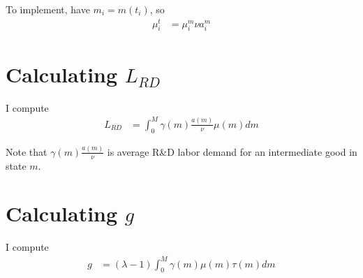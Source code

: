 \documentclass[12pt,english]{article}
\theoremstyle{remark}
\begin{document}
To implement, have $m_i = m(t_i)$, so
\begin{align*}
\mu^t_i &= \mu^m_i \nu a^m_i 
\end{align*}

\section{Calculating $L_{RD}$}

I compute
\begin{align*}
	L_{RD} &= \int_0^M \gamma(m) \frac{a(m)}{\nu} \mu(m)  dm
\end{align*}

Note that $\gamma(m) \frac{a(m)}{\nu}$ is average R\&D labor demand for an intermediate good in state $m$.

\section{Calculating $g$}

I compute
\begin{align*}
	g &= (\lambda - 1)\int_0^M \gamma(m) \mu(m) \tau(m) dm
\end{align*}
\end{document}
